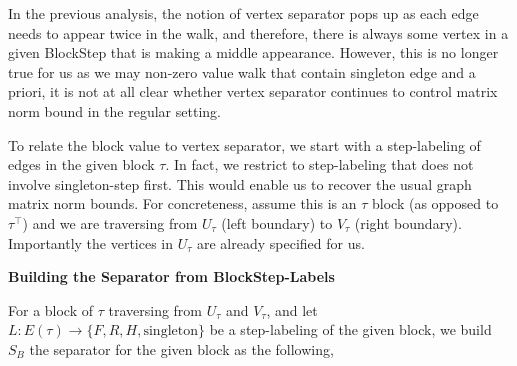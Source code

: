 In the previous analysis, the notion of vertex separator pops up as each edge needs to appear twice in the walk, and therefore, there is always some vertex in a given BlockStep that is making a middle appearance. However, this is no longer true for us as we may non-zero value walk that contain singleton edge and a priori, it is not at all clear whether vertex separator continues to control matrix norm bound in the regular setting.\par




To relate the block value to vertex separator, we start with a step-labeling of edges in the given block $\tau$. In fact, we restrict to step-labeling that does not involve singleton-step first. This would enable us to recover the usual graph matrix norm bounds. For concreteness, assume this is an $\tau$ block (as opposed to $\tau^{\top}$) and we are traversing from $U_{\tau}$ (left boundary) to $V_{\tau}$ (right boundary). Importantly the vertices in $U_{\tau}$ are already specified for us.\par




\par\medskip\noindent\textbf{Building the Separator from BlockStep-Labels}\par




For a block of $\tau$ traversing from $U_{\tau}$ and $V_{\tau}$, and let $L:E(\tau)\rightarrow\{F,R,H,\text{singleton}\}$ be a step-labeling of the given block, we build $S_{B}$ the separator for the given block as the following,\par


